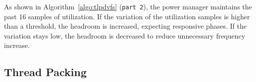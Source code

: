 \begin{comment}
\begin{table}[tb]
\begin{center}
\begin{tabular}{r|r}
\hline \hline
Threshold       & Probability   \\ \hline
80      &       0.003   \\
85      &       0.013   \\
90      &       0.003   \\
95      &       0.009   \\
\hline \hline
\end{tabular}
\end{center}
\caption{Probability of peak utilization with the interative applications}
\label{tab:prob_peak}
\end{table}

To show the utilization stability of interative applications, Table~\ref{tab:prob_peak} presents
the probability of peak utilization for the interative applications.
It checks whether CPU utilization reaches 99-100\%, meaning the current
frequency setting can be too low for the current CPU load. Such a low frequency setting can degrade the application
performance, as the application cannot receive enough CPU resource.
It uses the on-demand governor, and uses four different {\tt up-threshold} settings from the conservative 80\% 
to the most aggresive 95\%. As shown by the table, the utility of interactive applications do not require
the conservative policy by the on-deman governor, as with even with a very high threadhold of 95\%, the probability
\end{comment}

As shown in Algorithm~\ref{algo:tlpdvfs} ({\tt part 2}),
the power manager maintains the past 16 samples of utilization.
If the variation of the utilization samples is higher than a threshold, the headroom
is increased, expecting responsive phases. If the variation stays low, the headroom
is decreased to reduce unnecessary frequency increase.

\subsection{Thread Packing}

